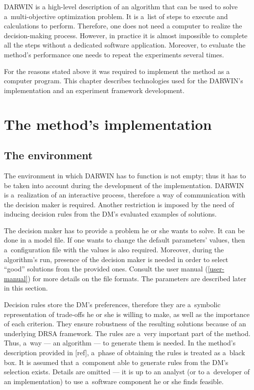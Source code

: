 DARWIN is a high-level description of an algorithm that can be used to solve
a~multi-objective optimization problem. It is a~list of steps to execute and
calculations to perform. Therefore, one does not need a computer to realize
the decision-making process. However, in practice it is almost impossible to
complete all the steps without a dedicated software application. Moreover, to
evaluate the method's performance one needs to repeat the experiments several
times.

For the reasons stated above it was required to implement the method as a
computer program. This chapter describes technologies used for the DARWIN's
implementation and an experiment framework development.

\section{The method's implementation}

\subsection{The environment}
\label{environ}

The environment in which DARWIN has to function is not empty; thus it has to
be taken into account during the development of the implementation. DARWIN is
a~realization of an interactive process, therefore a way of communication with
the decision maker is required. Another restriction is imposed by the need of
inducing decision rules from the DM's evaluated examples of solutions.

The decision maker has to provide a problem he or she wants to solve. It can
be done in a model file. If one wants to change the default parameters'
values, then a~configuration file with the values is also required. Moreover,
during the algorithm's run, presence of the decision maker is needed in order
to select ``good'' solutions from the provided ones. Consult the user manual
(\ref{user-manual}) for more details on the file formats. The parameters are
described later in this section.

Decision rules store the DM's preferences, therefore they are a~symbolic
representation of trade-offs he or she is willing to make, as well as the
importance of each criterion. They ensure robustness of the resulting
solutions because of an underlying DRSA framework. The rules are a~very
important part of the method. Thus, a~way --- an algorithm --- to generate
them is needed. In the method's description provided in [ref], a~phase of
obtaining the rules is treated as a~black box. It is assumed that a~component
able to generate rules from the DM's selection exists. Details are omitted ---
it is up to an analyst (or to a~developer of an implementation) to use
a~software component he or she finds feasible.

